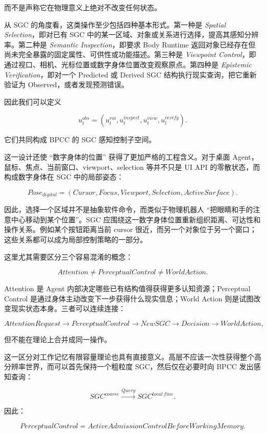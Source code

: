 而不是声称它在物理意义上绝对不改变任何状态。

从 SGC 的角度看，这类操作至少包括四种基本形式。第一种是 \emph{Spatial Selection}，即对已有 SGC 中的某一区域、对象或关系进行选择，提高其感知分辨率。第二种是 \emph{Semantic Inspection}，即要求 Body Runtime 返回对象已经存在但尚未完全暴露的固定属性、可供性或功能描述。第三种是 \emph{Viewpoint Control}，即通过视口、相机、光标位置或数字身体位置改变观察原点。第四种是 \emph{Epistemic Verification}，即对一个 Predicted 或 Derived SGC 结构执行现实查询，把它重新验证为 Observed，或者发现预测错误。

因此我们可以定义

\[
u_t^{obs}
=
\left(
u_t^{roi},
u_t^{inspect},
u_t^{view},
u_t^{verify}
\right).
\]

它们共同构成 BPCC 的 SGC 感知控制子空间。

这一设计还使 ``数字身体的位置'' 获得了更加严格的工程含义。对于桌面 Agent，鼠标、焦点、当前窗口、viewport、selection 等并不只是 UI API 的零散状态，而构成数字身体在 SGC 中的局部姿态：

\[
Pose_{digital}
=
(
Cursor,
Focus,
Viewport,
Selection,
ActiveSurface
).
\]

因此，选择一个区域并不是抽象软件命令，而类似于物理机器人 ``把眼睛和手的注意中心移动到某个位置''。SGC 应围绕这一数字身体位置重新组织距离、可达性和操作关系。例如某个按钮距离当前 cursor 很近，而另一个对象位于另一个窗口；这些关系都可以成为局部控制策略的一部分。

这里尤其需要区分三个容易混淆的概念：

\[
\boxed{
Attention
\neq
PerceptualControl
\neq
WorldAction.
}
\]

Attention 是 Agent 内部决定哪些已有结构值得获得更多认知资源；Perceptual Control 是通过身体主动改变下一步获得什么现实信息；World Action 则是试图改变现实状态本身。三者可以连续连接：

\[
AttentionRequest
\rightarrow
PerceptualControl
\rightarrow
NewSGC
\rightarrow
Decision
\rightarrow
WorldAction,
\]

但不能在理论上合并成同一操作。

这一区分对工作记忆有限容量理论也具有直接意义。高层不应该一次性获得整个高分辨率世界，而可以首先保持一个粗粒度 SGC，然后仅在必要时向 BPCC 发出感知查询：

\[
SGC^{coarse}
\xrightarrow{Query}
SGC^{local\ fine}.
\]

因此：

\[
\boxed{
PerceptualControl
=
ActiveAdmissionControlBeforeWorkingMemory.
}
\]

